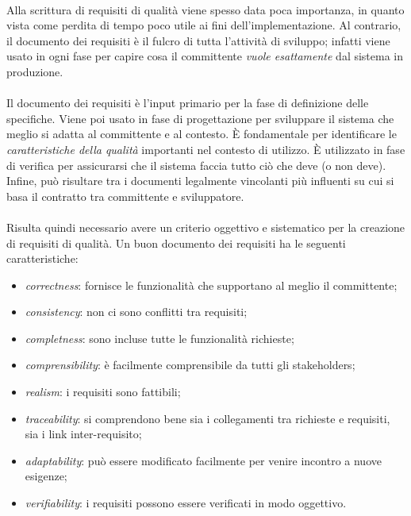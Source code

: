 \documentclass[11pt,a4paper,english]{article}
\begin{document}
\paragraph{} Alla scrittura di requisiti di qualità viene spesso data poca importanza, in quanto vista come perdita di tempo poco utile ai fini dell'implementazione. Al contrario, il documento dei requisiti è il fulcro di tutta l'attività di sviluppo; infatti viene usato in ogni fase per capire cosa il committente \emph{vuole esattamente} dal sistema in produzione. 

\paragraph{} Il documento dei requisiti \cite{req_document} è l'input primario per la fase di definizione delle specifiche. Viene poi usato in fase di progettazione per sviluppare il sistema che meglio si adatta al committente e al contesto. È fondamentale per identificare le \emph{caratteristiche della qualità} importanti nel contesto di utilizzo. È utilizzato in fase di verifica per assicurarsi che il sistema faccia tutto ciò che deve (o non deve). Infine, può risultare tra i documenti legalmente vincolanti più influenti su cui si basa il contratto tra committente e sviluppatore. 

\paragraph{} Risulta quindi necessario avere un criterio oggettivo e sistematico per la creazione di requisiti di qualità. Un buon documento dei requisiti ha le seguenti caratteristiche:
\begin{itemize}
    \item \emph{correctness}: fornisce le funzionalità che supportano al meglio il committente;
    \item \emph{consistency}: non ci sono conflitti tra requisiti;
    \item \emph{completness}: sono incluse tutte le funzionalità richieste;
    \item \emph{comprensibility}: è facilmente comprensibile da tutti gli stakeholders;
    \item \emph{realism}: i requisiti sono fattibili;
    \item \emph{traceability}: si comprendono bene sia i collegamenti tra richieste e requisiti, sia i link inter-requisito;
    \item \emph{adaptability}: può essere modificato facilmente per venire incontro a nuove esigenze;
    \item \emph{verifiability}: i requisiti possono essere verificati in modo oggettivo.
\end{itemize}
\end{document}
